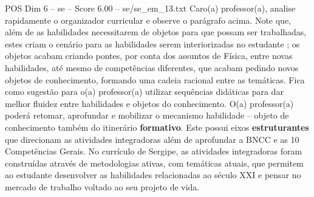 \begin{textsample}{POS Dim 6 – se – Score 6.00 – se/se\_em\_13.txt}
Caro(a) professor(a), analise rapidamente o organizador curricular e observe o parágrafo acima.
Note que, além de as habilidades necessitarem de objetos para que possam ser trabalhadas, estes criam o cenário para as habilidades serem interiorizadas no estudante ; os objetos acabam criando pontes, por conta dos assuntos de Física, entre novas habilidades, até mesmo de competências diferentes, que acabam pedindo novos objetos de conhecimento, formando uma cadeia racional entre as temáticas.
Fica como sugestão para o(a) professor(a) utilizar sequências didáticas para dar melhor fluidez entre habilidades e objetos do conhecimento.
O(a) professor(a) poderá retomar, aprofundar e mobilizar o mecanismo habilidade – objeto de conhecimento também do itinerário \textbf{formativo}.
Este possui eixos \textbf{estruturantes} que direcionam as atividades integradoras além de aprofundar a BNCC e as 10 Competências Gerais.
No currículo de Sergipe, as atividades integradoras foram construídas através de metodologias ativas, com temáticas atuais, que permitem ao estudante desenvolver as habilidades relacionadas ao século XXI e pensar no mercado de trabalho voltado ao seu projeto de vida.

\end{textsample}
